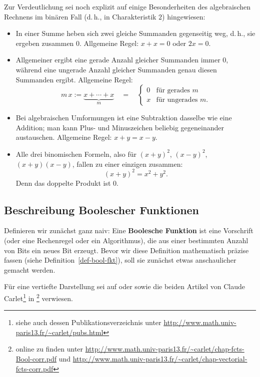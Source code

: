 \begin{refsegment}
Zur Verdeutlichung sei noch explizit auf einige Besonderheiten des
algebraischen Rechnens im binären Fall (d.\,h., in Charakteristik $2$)
hingewiesen:
\begin{itemize}
   \item In einer Summe heben sich zwei gleiche Summanden gegenseitig
      weg, d.\,h., sie ergeben zusammen $0$. Allgemeine Regel: $x + x = 0$
      oder $2x = 0$.
   \item Allgemeiner ergibt eine gerade Anzahl gleicher Summanden immer $0$,
      während eine ungerade Anzahl gleicher Summanden genau diesen Summanden
      ergibt. Allgemeine Regel:
\[
         m \, x := \underbrace{x + \cdots + x}_m \quad = \quad
            \begin{cases}
               0 & \text{für gerades } m \\ x & \text{für ungerades } m.
            \end{cases}
\]
   \item Bei algebraischen Umformungen ist eine Subtraktion dasselbe wie
      eine Addition; man kann Plus- und Minuszeichen beliebig gegeneinander
      austauschen. Allgemeine Regel: $x + y = x - y$.
   \item Alle drei binomischen Formeln, also für $(x + y)^2$, $(x - y)^2$,
      $(x + y)(x - y)$, fallen zu einer einzigen zusammen:
\[
         (x + y)^2 = x^2 + y^2.
\]
      Denn das doppelte Produkt ist $0$.
\end{itemize}


\subsection{Beschreibung Boolescher Funktionen}\label{ss-bool-descr}

Definieren wir zunächst ganz naiv: Eine {\textbf{Boolesche
Funktion}} ist eine
Vorschrift (oder eine Rechenregel oder ein Algorithmus), die aus einer
bestimmten Anzahl von Bits ein neues Bit erzeugt. Bevor wir diese
Definition mathematisch präzise fassen (siehe Definition~\ref{def-bool-fkt}),
soll sie zunächst etwas anschaulicher gemacht werden.

Für eine vertiefte Darstellung sei auf \cite{CuSt2009} oder \cite{Pomm2008, Pomm2014}
sowie die beiden Artikel von Claude Carlet\footnote{%
  siehe auch dessen Publikationsverzeichnis unter
  \url{http://www.math.univ-paris13.fr/~carlet/pubs.html}
} in \cite{CrHa2010}\footnote{%
  online zu finden unter
  \url{http://www.math.univ-paris13.fr/~carlet/chap-fcts-Bool-corr.pdf}  und
  \url{http://www.math.univ-paris13.fr/~carlet/chap-vectorial-fcts-corr.pdf}
} verwiesen.


\end{refsegment}

